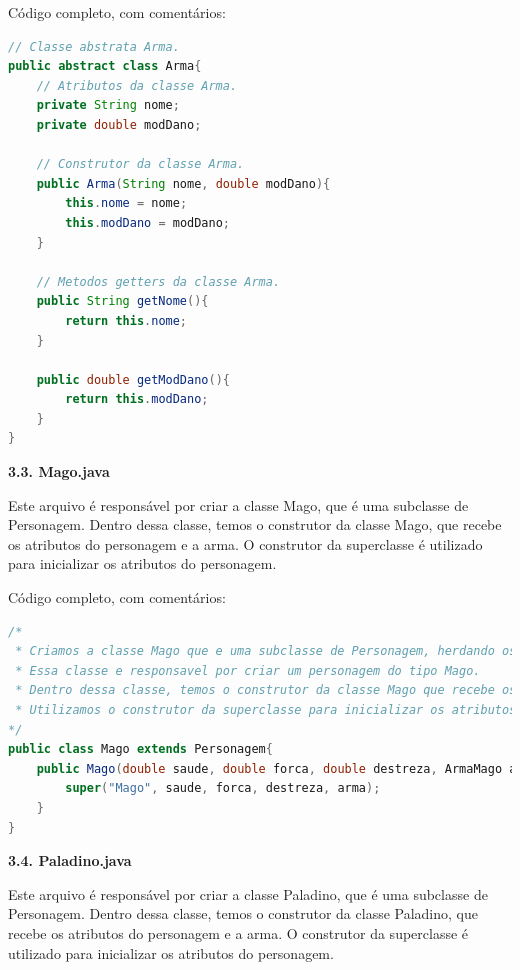 \documentclass[11pt]{uiobrev}
\begin{document}
Código completo, com comentários: 

\begin{lstlisting}[language=Java, caption={Classe Abstrata Arma}]
// Classe abstrata Arma.
public abstract class Arma{
    // Atributos da classe Arma.
    private String nome;
    private double modDano;

    // Construtor da classe Arma.
    public Arma(String nome, double modDano){
        this.nome = nome;
        this.modDano = modDano;
    }

    // Metodos getters da classe Arma.
    public String getNome(){
        return this.nome;
    }

    public double getModDano(){
        return this.modDano;
    }
}
\end{lstlisting}


\vspace{0.5cm}
\Large \textbf{3.3. Mago.java}

Este arquivo é responsável por criar a classe Mago, que é uma subclasse de Personagem. Dentro dessa classe, temos o construtor da classe Mago, que recebe os atributos do personagem e a arma. O construtor da superclasse é utilizado para inicializar os atributos do personagem.

Código completo, com comentários: 

\newpage
\begin{lstlisting}[language=Java, caption={Classe Mago, subclasse de Personagem}]
/*
 * Criamos a classe Mago que e uma subclasse de Personagem, herdando os atributos e metodos de personagem.
 * Essa classe e responsavel por criar um personagem do tipo Mago.
 * Dentro dessa classe, temos o construtor da classe Mago que recebe os valores de saude, forca, destreza e a arma.
 * Utilizamos o construtor da superclasse para inicializar os atributos de personagem.
*/
public class Mago extends Personagem{
    public Mago(double saude, double forca, double destreza, ArmaMago arma){
        super("Mago", saude, forca, destreza, arma);
    }
}
\end{lstlisting}

\vspace{0.5cm}
\Large \textbf{3.4. Paladino.java}

Este arquivo é responsável por criar a classe Paladino, que é uma subclasse de Personagem. Dentro dessa classe, temos o construtor da classe Paladino, que recebe os atributos do personagem e a arma. O construtor da superclasse é utilizado para inicializar os atributos do personagem.
\end{document}
